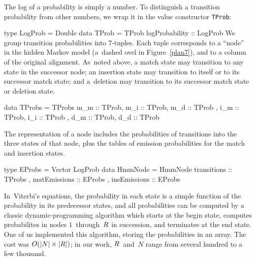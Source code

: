 \documentclass[preprint,nonatbib,blockstyle,nocopyrightspace,times]{sigplanconf}
\newcommand\alignwidth{\ensuremath R} %
\newcommand\figref[1]{Figure~\ref{#1}}
\newenvironment{smallverbatim}{\par\small\verbatim}{\endverbatim}
\begin{document}
The log of a probability is simply a number.
To distinguish a transition probability from other numbers, we wrap it in
the value constructor \texttt{TProb}:
\begin{smallverbatim}
type LogProb = Double
data TProb   = TProb { logProbability :: LogProb }
\end{smallverbatim}
We group transition probabilities into 7-tuples.
Each tuple corresponds to a ``node'' in the hidden Markov model
(a~dashed ovel in \figref{plan7}), and to a column of the original
alignment.
As~noted above, 
a match state may transition to any state in the successor node;
an insertion state may transition to itself or to its successor match
state;
and
a~deletion may transition to its successor match
state or deletion state.
\begin{smallverbatim}
data TProbs = 
     TProbs { m_m :: TProb, m_i :: TProb, m_d :: TProb
            , i_m :: TProb, i_i :: TProb
            , d_m :: TProb, d_d :: TProb }
\end{smallverbatim}

The representation of a node includes the probabilities of transitions
into the three states of that node, plus the tables
of emission probabilities for the match and insertion states.
\begin{smallverbatim}
type EProbs  = Vector LogProb
data HmmNode = HmmNode { transitions  :: TProbs
                       , matEmissions :: EProbs
                       , insEmissions :: EProbs
                       }
\end{smallverbatim}

In~Viterbi's equations,
the probability in each state is a simple function of the probability
in its predecessor states, 
and all probabilities can be computed by a classic dynamic-programming
algorithm
which starts at the begin state,
computes probabilites in nodes $1$~through~$\alignwidth$ in
succession, and terminates at the end state.
One of us implemented this algorithm, storing the probabilities in an array.
The cost was
$O(|N|\times|\alignwidth|)$;
in our work, $\alignwidth$~and~$N$ range from several hundred to a few
thousand.



\end{document}

